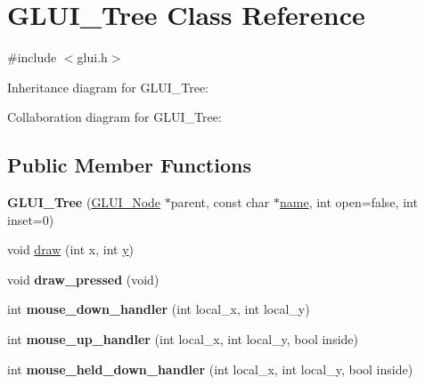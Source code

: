 \hypertarget{class_g_l_u_i___tree}{\section{G\+L\+U\+I\+\_\+\+Tree Class Reference}
\label{class_g_l_u_i___tree}
}


{\ttfamily \#include $<$glui.\+h$>$}



Inheritance diagram for G\+L\+U\+I\+\_\+\+Tree\+:


Collaboration diagram for G\+L\+U\+I\+\_\+\+Tree\+:
\subsection*{Public Member Functions}
\begin{DoxyCompactItemize}
\item 
\hypertarget{class_g_l_u_i___tree_a2c31d1ac60654e1ee8b818c80bbb965a}{{\bfseries G\+L\+U\+I\+\_\+\+Tree} (\hyperlink{class_g_l_u_i___node}{G\+L\+U\+I\+\_\+\+Node} $\ast$parent, const char $\ast$\hyperlink{class_g_l_u_i___control_aa95b97d50df45335fc33f0af03958eb3}{name}, int open=false, int inset=0)}\label{class_g_l_u_i___tree_a2c31d1ac60654e1ee8b818c80bbb965a}

\item 
void \hyperlink{class_g_l_u_i___tree_a95b179b8d413fc280ef58cb62f9defb2}{draw} (int x, int \hyperlink{_ice_utils_8h_aa7ffaed69623192258fb8679569ff9ba}{y})
\item 
\hypertarget{class_g_l_u_i___tree_a1360117342c313ed0c1cdd879f4550f5}{void {\bfseries draw\+\_\+pressed} (void)}\label{class_g_l_u_i___tree_a1360117342c313ed0c1cdd879f4550f5}

\item 
\hypertarget{class_g_l_u_i___tree_a0b127300ac1c19eb94122c4255ab2834}{int {\bfseries mouse\+\_\+down\+\_\+handler} (int local\+\_\+x, int local\+\_\+y)}\label{class_g_l_u_i___tree_a0b127300ac1c19eb94122c4255ab2834}

\item 
\hypertarget{class_g_l_u_i___tree_afadc8d29f7aaf67b907009e80f7b861e}{int {\bfseries mouse\+\_\+up\+\_\+handler} (int local\+\_\+x, int local\+\_\+y, bool inside)}\label{class_g_l_u_i___tree_afadc8d29f7aaf67b907009e80f7b861e}

\item 
\hypertarget{class_g_l_u_i___tree_aef3c1c1a7854845d9cdd338907e46485}{int {\bfseries mouse\+\_\+held\+\_\+down\+\_\+handler} (int local\+\_\+x, int local\+\_\+y, bool inside)}\label{class_g_l_u_i___tree_aef3c1c1a7854845d9cdd338907e46485}


\end{DoxyCompactItemize}
